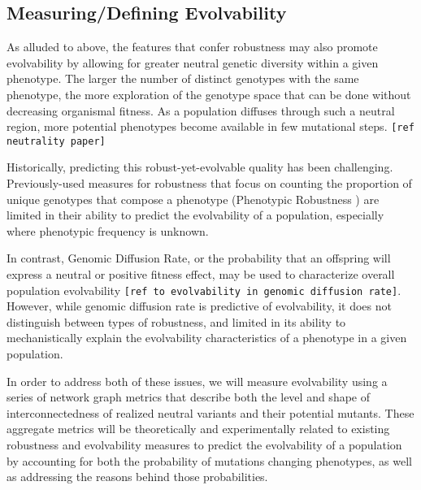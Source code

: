 \subsection{Measuring/Defining Evolvability}

As alluded to above, the features that confer robustness may also promote evolvability by allowing for greater neutral genetic diversity within a given phenotype. The larger the number of distinct genotypes with the same phenotype, the more exploration of the genotype space that can be done without decreasing organismal fitness. As a population diffuses through such a neutral region, more potential phenotypes become available in few mutational steps. \verb|[ref neutrality paper]|

Historically, predicting this robust-yet-evolvable quality has been challenging. Previously-used measures for robustness that focus on counting the proportion of unique genotypes that compose a phenotype (Phenotypic Robustness \cite{andreas_wagner_robustness_2008}) are limited in their ability to predict the evolvability of a population, especially where phenotypic frequency is unknown. 

In contrast, Genomic Diffusion Rate, or the probability that an offspring will express a neutral or positive fitness effect, may be used to characterize overall population evolvability \verb|[ref to evolvability in genomic diffusion rate]|. However, while genomic diffusion rate is predictive of evolvability, it does not distinguish between types of robustness, and limited in its ability to mechanistically explain the evolvability characteristics of a phenotype in a given population. 

In order to address both of these issues, we will measure evolvability using a series of network graph metrics that describe both the level and shape of interconnectedness of realized neutral variants and their potential mutants. These aggregate metrics will be theoretically and experimentally related to existing robustness and evolvability measures to predict the evolvability of a population by accounting for both the probability of mutations changing phenotypes, as well as addressing the reasons behind those probabilities.


